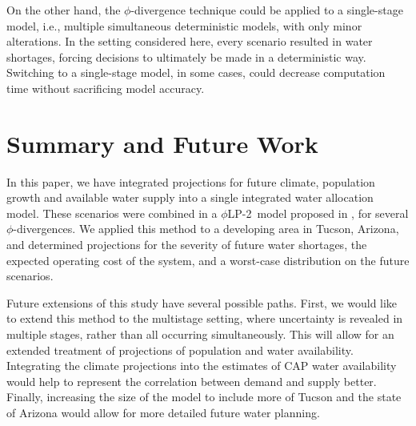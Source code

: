 \documentclass[opre,nonblindrev]{informs3} %
\newcommand{\plp}{$\phi$LP-2}
\begin{document}
On the other hand, the $\phi$-divergence technique could be applied to a single-stage model, i.e., multiple simultaneous deterministic models, with only minor alterations.
In the setting considered here, every scenario resulted in water shortages, forcing decisions to ultimately be made in a deterministic way.
Switching to a single-stage model, in some cases, could decrease computation time without sacrificing model accuracy.



\section{Summary and Future Work}
\label{sec:concl}

In this paper, we have integrated projections for future climate, population growth and available water supply into a single integrated water allocation model.
These scenarios were combined in a \plp\ model proposed in \cite{love2013phi}, for several $\phi$-divergences.
We applied this method to a developing area in Tucson, Arizona, and determined projections for the severity of future water shortages, the expected operating cost of the system, and a worst-case distribution on the future scenarios.

Future extensions of this study have several possible paths.
First, we would like to extend this method to the multistage setting, where uncertainty is revealed in multiple stages, rather than all occurring simultaneously.
This will allow for an extended treatment of projections of population and water availability.
Integrating the climate projections into the estimates of CAP water availability would help to represent the correlation between demand and supply better.
Finally, increasing the size of the model to include more of Tucson and the state of Arizona would allow for more detailed future water planning.




%
\end{document}
